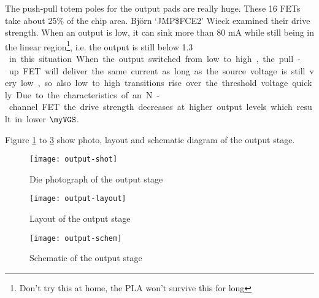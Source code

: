 The push-pull totem poles for the output pads are really huge. These 16 FETs
take about 25\% of the chip area. Björn `JMP\$FCE2' Wieck examined their
drive strength. When an output is low, it can sink more than 80 mA while
still being in the linear region\footnote{Don't try this at home, the PLA
won't survive this for long}, i.e. the output is still below \SI{1.3}{\volt
} in this situation. When the output switched from low to high, the pull-up
FET will deliver the same current as long as the source voltage is still
very low, so also low to high transitions rise over the threshold voltage
quickly. Due to the characteristics of an N-channel FET the drive strength
decreases at higher output levels which result in lower $\myVGS$.

Figure \ref{fig:output-shot} to \ref{fig:output-schem} show photo, layout and
schematic diagram of the output stage.

\begin{figure}
    \centering
    \texttt{[image: output-shot]}
    \caption{Die photograph of the output stage}
    \label{fig:output-shot}
\end{figure}

\begin{figure}
    \centering
    \texttt{[image: output-layout]}
    \caption{Layout of the output stage}
    \label{fig:output-layout}
\end{figure}

\begin{figure}
    \centering
    \texttt{[image: output-schem]}
    \caption{Schematic of the output stage}
    \label{fig:output-schem}
\end{figure}


